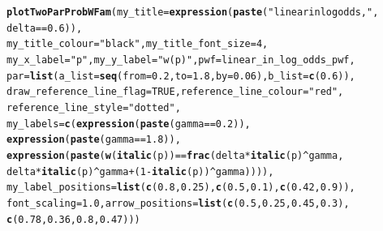 \documentclass{article}\usepackage[]{graphicx}\usepackage[]{color}
\makeatletter
\newcommand{\hlnum}[1]{\textcolor[rgb]{0.686,0.059,0.569}{#1}}%
\newcommand{\hlstr}[1]{\textcolor[rgb]{0.192,0.494,0.8}{#1}}%
\newcommand{\hlopt}[1]{\textcolor[rgb]{0,0,0}{#1}}%
\newcommand{\hlstd}[1]{\textcolor[rgb]{0.345,0.345,0.345}{#1}}%
\newcommand{\hlkwc}[1]{\textcolor[rgb]{0.333,0.667,0.333}{#1}}%
\newcommand{\hlkwd}[1]{\textcolor[rgb]{0.737,0.353,0.396}{\textbf{#1}}}%
\newenvironment{kframe}{%
 \def\at@end@of@kframe{}%
 \ifinner\ifhmode%
  \def\at@end@of@kframe{\end{minipage}}%
  \begin{minipage}{\columnwidth}%
 \fi\fi%
 \def\FrameCommand##1{\hskip\@totalleftmargin \hskip-\fboxsep
 \colorbox{shadecolor}{##1}\hskip-\fboxsep
     \hskip-\linewidth \hskip-\@totalleftmargin \hskip\columnwidth}%
 \MakeFramed {\advance\hsize-\width
   \@totalleftmargin\z@ \linewidth\hsize
   \@setminipage}}%
 {\par\unskip\endMakeFramed%
 \at@end@of@kframe}
\newenvironment{knitrout}{}{} %
\makeatother
\begin{document}
\begin{knitrout}
\color{fgcolor}\begin{kframe}
\begin{alltt}
\hlkwd{plotTwoParProbWFam}\hlstd{(}\hlkwc{my_title}\hlstd{=}\hlkwd{expression}\hlstd{(}\hlkwd{paste}\hlstd{(}\hlstr{"linear in log odds,  "}\hlstd{,}
        \hlstd{delta} \hlopt{==} \hlnum{0.6}\hlstd{)),}
        \hlkwc{my_title_colour}\hlstd{=}\hlstr{"black"}\hlstd{,} \hlkwc{my_title_font_size}\hlstd{=}\hlnum{4}\hlstd{,}
        \hlkwc{my_x_label} \hlstd{=} \hlstr{"p"}\hlstd{,} \hlkwc{my_y_label} \hlstd{=} \hlstr{"w(p)"}\hlstd{,} \hlkwc{pwf}\hlstd{=linear_in_log_odds_pwf,}
        \hlkwc{par}\hlstd{=}\hlkwd{list}\hlstd{(}\hlkwc{a_list}\hlstd{=}\hlkwd{seq}\hlstd{(}\hlkwc{from}\hlstd{=}\hlnum{0.2}\hlstd{,} \hlkwc{to}\hlstd{=}\hlnum{1.8}\hlstd{,} \hlkwc{by}\hlstd{=}\hlnum{0.06}\hlstd{),} \hlkwc{b_list}\hlstd{=}\hlkwd{c}\hlstd{(}\hlnum{0.6}\hlstd{)),}
        \hlkwc{draw_reference_line_flag}\hlstd{=}\hlnum{TRUE}\hlstd{,} \hlkwc{reference_line_colour}\hlstd{=}\hlstr{"red"}\hlstd{,}
        \hlkwc{reference_line_style}\hlstd{=}\hlstr{"dotted"}\hlstd{,}
        \hlkwc{my_labels}\hlstd{=}\hlkwd{c}\hlstd{(}\hlkwd{expression}\hlstd{(}\hlkwd{paste}\hlstd{(gamma} \hlopt{==} \hlnum{0.2}\hlstd{)),}
                \hlkwd{expression}\hlstd{(}\hlkwd{paste}\hlstd{(gamma} \hlopt{==} \hlnum{1.8}\hlstd{)),}
                \hlkwd{expression}\hlstd{(}\hlkwd{paste}\hlstd{(}\hlkwd{w}\hlstd{(}\hlkwd{italic}\hlstd{(p))} \hlopt{==} \hlkwd{frac}\hlstd{(delta} \hlopt{*} \hlkwd{italic}\hlstd{(p)}\hlopt{^}\hlstd{gamma,}
                        \hlstd{delta} \hlopt{*} \hlkwd{italic}\hlstd{(p)}\hlopt{^}\hlstd{gamma} \hlopt{+} \hlstd{(}\hlnum{1}\hlopt{-}\hlkwd{italic}\hlstd{(p))}\hlopt{^}\hlstd{gamma)))),}
        \hlkwc{my_label_positions}\hlstd{=}\hlkwd{list}\hlstd{(}\hlkwd{c}\hlstd{(}\hlnum{0.8}\hlstd{,}\hlnum{0.25}\hlstd{),}\hlkwd{c}\hlstd{(}\hlnum{0.5}\hlstd{,}\hlnum{0.1}\hlstd{),}\hlkwd{c}\hlstd{(}\hlnum{0.42}\hlstd{,} \hlnum{0.9}\hlstd{)),}
        \hlkwc{font_scaling}\hlstd{=}\hlnum{1.0}\hlstd{,} \hlkwc{arrow_positions} \hlstd{=} \hlkwd{list}\hlstd{(}\hlkwd{c}\hlstd{(}\hlnum{0.5}\hlstd{,}\hlnum{0.25}\hlstd{,}\hlnum{0.45}\hlstd{,}\hlnum{0.3}\hlstd{),}
                \hlkwd{c}\hlstd{(}\hlnum{0.78}\hlstd{,}\hlnum{0.36}\hlstd{,}\hlnum{0.8}\hlstd{,}\hlnum{0.47}\hlstd{)))}
\end{alltt}
\end{kframe}


\end{knitrout}
\end{document}
